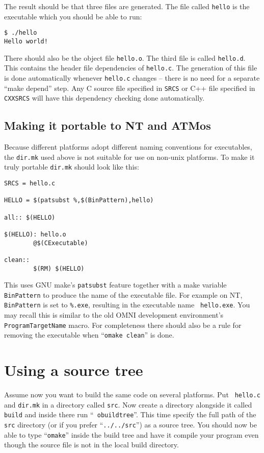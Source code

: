 \documentclass[11pt,twoside,onecolumn]{article}
\begin{document}
The result should be that three files are generated.  The file called
{\tt hello} is the executable which you should be able to run:

{\small \begin{verbatim}
$ ./hello
Hello world!
\end{verbatim}}

There should also be the object file {\tt hello.o}.  The third file is called
{\tt hello.d}.  This contains the header file dependencies of {\tt hello.c}.
The generation of this file is done automatically whenever {\tt hello.c}
changes -- there is no need for a separate ``make depend'' step.  Any C source
file specified in {\tt SRCS} or C++ file specified in {\tt CXXSRCS} will have
this dependency checking done automatically.

\subsection{Making it portable to NT and ATMos}

Because different platforms adopt different naming conventions for executables,
the {\tt dir.mk} used above is not suitable for use on non-unix platforms.  To
make it truly portable {\tt dir.mk} should look like this:

{\small \begin{verbatim}
SRCS = hello.c

HELLO = $(patsubst %,$(BinPattern),hello)

all:: $(HELLO)

$(HELLO): hello.o
        @$(CExecutable)

clean::
        $(RM) $(HELLO)
\end{verbatim}}

This uses GNU make's {\tt patsubst} feature together with a make variable {\tt
BinPattern} to produce the name of the executable file.  For example on NT,
{\tt BinPattern} is set to {\tt \%.exe}, resulting in the executable name {\tt
hello.exe}.  You may recall this is similar to the old OMNI development
environment's {\tt ProgramTargetName} macro.  For completeness there should
also be a rule for removing the executable when ``{\tt omake clean}'' is done.

\section{Using a source tree}

Assume now you want to build the same code on several platforms.  Put {\tt
hello.c} and {\tt dir.mk} in a directory called {\tt src}.  Now create a
directory alongside it called {\tt build} and inside there run ``{\tt
obuildtree}''.  This time specify the full path of the {\tt src} directory (or
if you prefer ``{\tt ../../src}'') as a source tree.  You should now be able to
type ``{\tt omake}'' inside the build tree and have it compile your program
even though the source file is not in the local build directory.
\end{document}
